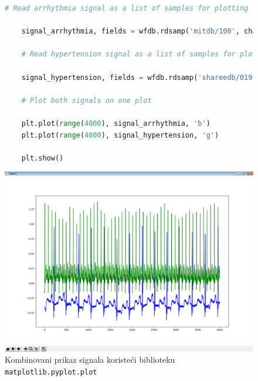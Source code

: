 \documentclass[12pt,a4paper]{article}
\begin{document}
\begin{figure}
\label{wfdb-pyplot}
\begin{lstlisting}[language=python]
    # Read arrhythmia signal as a list of samples for plotting

    signal_arrhythmia, fields = wfdb.rdsamp('mitdb/100', channels=[0], sampfrom=100000, sampto=104000)

    # Read hypertension signal as a list of samples for plotting

    signal_hypertension, fields = wfdb.rdsamp('shareedb/01911', channels=[0], sampfrom=100000, sampto=104000)

    # Plot both signals on one plot

    plt.plot(range(4000), signal_arrhythmia, 'b')
    plt.plot(range(4000), signal_hypertension, 'g')

    plt.show()
\end{lstlisting}
\end{figure}

\begin{figure}[H]
\center
\includegraphics[scale=0.45]{../res/plot-combined.PNG}
\caption{Kombinovani prikaz signala koristeći biblioteku \texttt{matplotlib.pyplot.plot}}
\label{combined}
\end{figure}
\end{document}
